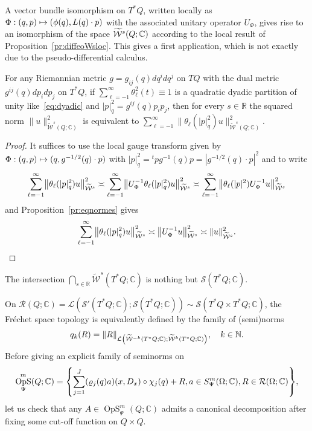 \documentclass[AHL,Unicode,longabstracts]{cedram}
\newcommand{\C}{\mathbb{C}}
\newcommand{\R}{\mathbb{R}}
\newcommand{\N}{\mathbb{N}}
\newcommand{\clW}{\mathcal{W}}
\newcommand{\clS}{\mathcal{S}}
\newcommand{\clL}{\mathcal{L}}
\newcommand{\clR}{\mathcal{R}}
\DeclareMathOperator{\OpS}{OpS}
\let\oldtilde\tilde
\renewcommand*{\tilde}[1]{\mathchoice{\widetilde{#1}}{\widetilde{#1}}{\oldtilde{#1}}{\oldtilde{#1}}}
\let\originalleft\left
\let\originalright\right
\renewcommand{\left}{\mathopen{}\mathclose\bgroup\originalleft}
\renewcommand{\right}{\aftergroup\egroup\originalright}
\let\oldmapsto\mapsto
\renewcommand*{\mapsto}{\mathchoice{\longmapsto}{\oldmapsto}{\oldmapsto}{\oldmapsto}}
\begin{document}
A vector bundle isomorphism on $T^{*}Q$, written locally as $\Phi:(q,p)\mapsto (\phi(q),\linebreak L(q)\cdot p)$ with the associated unitary operator $U_{\Phi}$, gives rise to an isomorphism of the space $\tilde{\clW}^{s}(Q;\C)$ according to the local result of Proposition~\ref{pr:diffeoWsloc}. This gives a first application, which is not exactly due to the pseudo-differential calculus.
\begin{prop}\label{pr:dyadic}
For any Riemannian metric $g=g_{ij}(q)dq^{i}dq^{j}$ on $TQ$ with the dual metric $g^{ij}(q)dp_{i}dp_{j}$ on $T^{*}Q$, if $\sum_{\ell=-1}^{\infty}\theta_{\ell}^{2}(t)\equiv 1$ is a quadratic dyadic partition of unity like~\eqref{eq:dyadic} and $|p|_{q}^{2}=g^{ij}(q)p_{i}p_{j}$, then for every $s\in \R$ the squared norm $\|u\|^{2}_{\widetilde{\clW}^{s}(Q;\C)}$ is equivalent to $\sum_{\ell=-1}^{\infty}\|\theta_{\ell}(|p|_{q}^{2})u\|^{2}_{\widetilde{\clW}^{s}(Q;\C)}$.
\end{prop}
\begin{proof}
It suffices to use the local gauge transform given by $\Phi:(q,p)\mapsto (q,g^{-1/2}(q)\cdot p)$ with $|p|_{q}^{2}={}^{t}p g^{-1}(q)p=|g^{-1/2}(q)\cdot p|^{2}$ and to write
\[
\sum_{\ell=-1}^{\infty}\left\|\theta_{\ell}(|p|_{q}^{2})u\right\|^{2}_{\widetilde{\clW}^{s}}\asymp\sum_{\ell=-1}^{\infty}
\left\|U_{\Phi}^{-1}\theta_{\ell}(|p|_{q}^{2})u\right\|^{2}_{\widetilde{\clW}^{s}}
\asymp\sum_{\ell=-1}^{\infty}\left\|\theta_{\ell}(|p|^{2})U_{\Phi}^{-1}u\right\|^{2}_{\widetilde{\clW}^{s}}
\]
and Proposition~\ref{pr:eqnormes} gives
\[
\sum_{\ell=-1}^{\infty}\left\|\theta_{\ell}(|p|_{q}^{2})u\right\|^{2}_{\widetilde{\clW}^{s}}\asymp \left\|U_{\Phi}^{-1}u\right\|^{2}_{\widetilde{\clW}^{s}}\asymp \|u\|^{2}_{\widetilde{\clW}^{s}}.\qedhere
\]
\end{proof}

The intersection $\bigcap_{s\in \R}\widetilde{\clW}^{s}(T^{*}Q;\C)$ is nothing but $\clS(T^{*}Q;\C)$.

On $\clR(Q;\C)=\clL(\clS'(T^{*}Q;\C);\clS(T^{*}Q;\C))\sim \clS(T^{*}Q\times T^{*}Q;\C)$, the Fréchet space topology is equivalently defined by the family of (semi)norms
\[
q_{k}(R)=\|R\|_{\clL\left(\widetilde{\clW}^{-k}(T^{*}Q;\C);\widetilde{\clW}^{k}(T^{*}Q;\C)\right)},\quad k\in\N.
\]
Before giving an explicit family of seminorms on
\[
\OpS^{m}_{\Psi}(Q;\C)=\left\{\sum_{j=1}^{J}(\varrho_{j}(q)a)(x,D_{x})\circ\chi_{j}(q)+ R, a\in S^{m}_{\Psi}(\Omega;\C), R\in \clR(\Omega;\C)\right\},
\]
let us check that any $A\in \OpS^{m}_{\Psi}(Q;\C)$ admits a canonical decomposition after fixing some cut-off function on $Q\times Q$.
\end{document}
